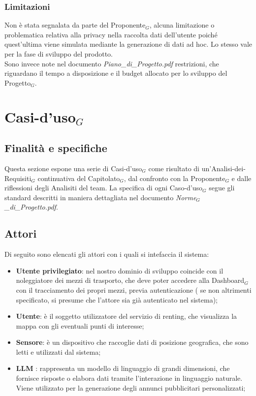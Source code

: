 \documentclass[11pt]{article}
\begin{document}
\begin{justify}
\subsubsection{Limitazioni}
Non è stata segnalata da parte del Proponente$_G$, alcuna limitazione o problematica relativa alla privacy nella raccolta dati dell'utente poiché quest'ultima viene simulata mediante la generazione di dati ad hoc. Lo stesso vale per la fase di sviluppo del prodotto.\\
Sono invece note nel documento \textit{Piano\_di\_Progetto.pdf} restrizioni, che riguardano il tempo a disposizione e il budget allocato per lo sviluppo del Progetto$_G$. 

\newpage
\section{Casi-d'uso$_G$}
\label{sec:casi-uso}

\subsection{Finalità e specifiche}
Questa sezione espone una serie di Casi-d'uso$_G$ come risultato di un'Analisi-dei-Requisiti$_G$ continuativa del Capitolato$_G$, dal confronto con la Proponente$_G$ e dalle riflessioni degli Analisiti del team. La specifica di ogni Caso-d'uso$_G$ segue gli standard descritti in maniera dettagliata nel documento \textit{Norme$_G$\_di\_Progetto.pdf}.
\subsection{Attori}
Di seguito sono elencati gli attori con i quali si intefaccia il sistema:
\begin{itemize}
    \item \textbf{Utente privilegiato}: nel nostro dominio di sviluppo coincide con il noleggiatore dei mezzi di trasporto, che deve poter accedere alla Dashboard$_G$ con il tracciamento dei propri mezzi, previa autenticazione ( se non altrimenti specificato, si presume che l'attore sia già autenticato nel sistema);
    \item \textbf{Utente}: è il soggetto utilizzatore del servizio di renting, che visualizza la mappa con gli eventuali punti di interesse;
    \item \textbf{Sensore}: è un dispositivo che raccoglie dati di posizione geografica, che sono letti e utilizzati dal sistema;
    \item \textbf{LLM} : rappresenta un modello di linguaggio di grandi dimensioni, che fornisce risposte o elabora dati tramite l'interazione in linguaggio naturale. Viene utilizzato per la generazione degli annunci pubblicitari personalizzati;
\end{itemize}


\end{justify}
\end{document}
